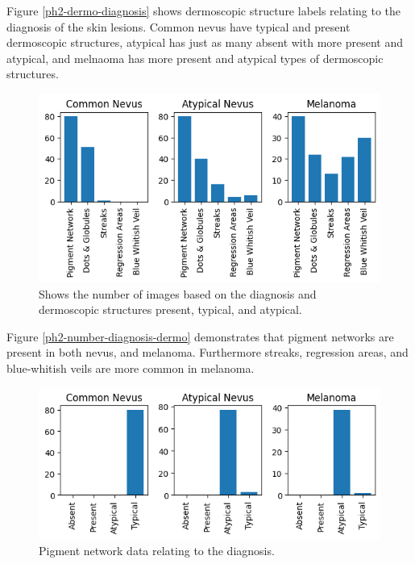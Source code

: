 Figure \ref{ph2-dermo-diagnosis} shows dermoscopic structure labels relating to the diagnosis of the skin lesions. Common nevus have typical and present dermoscopic structures, atypical has just as many absent with more present and atypical, and melnaoma has more present and atypical types of dermoscopic structures. 

\begin{figure}
	\centering
	\includegraphics[scale=0.8]{images/ph2/ph2-number-diagnosis-dermo.png}
	\caption{Shows the number of images based on the diagnosis and dermoscopic structures present, typical, and atypical.} 
\end{figure} \label{ph2-number-diagnosis-dermo}

Figure \ref{ph2-number-diagnosis-dermo} demonstrates that pigment networks are present in both nevus, and melanoma. Furthermore streaks, regression areas, and blue-whitish veils are more common in melanoma.

\begin{figure}
	\centering
	\includegraphics[scale=0.8]{images/ph2/ph2-pigment-diagnosis.png}
	\caption{Pigment network data relating to the diagnosis.} 
\end{figure} \label{ph2-number-diagnosis-dermo}

